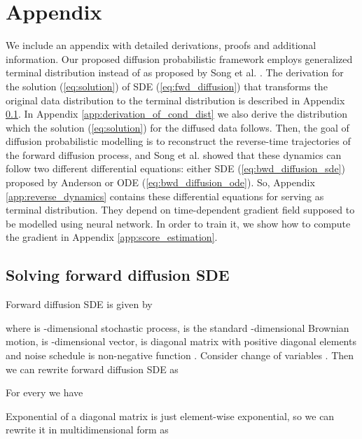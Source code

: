 \documentclass{article}
\begin{document}
\newpage
\onecolumn
\section*{Appendix}
\label{sec:appendix}
We include an appendix with detailed derivations, proofs and additional information. Our proposed diffusion probabilistic framework employs generalized terminal distribution  instead of  as proposed by Song et al. . The derivation for the solution (\ref{eq:solution}) of SDE (\ref{eq:fwd_diffusion}) that transforms the original data distribution to the terminal distribution is described in Appendix \ref{app:solving_forward_diff_sde}. In Appendix \ref{app:derivation_of_cond_dist} we also derive the distribution which the solution (\ref{eq:solution}) for the diffused data  follows. Then, the goal of diffusion probabilistic modelling is to reconstruct the reverse-time trajectories of the forward diffusion process, and Song et al.  showed that these dynamics can follow two different differential equations: either SDE (\ref{eq:bwd_diffusion_sde}) proposed by Anderson  or ODE (\ref{eq:bwd_diffusion_ode}). So, Appendix \ref{app:reverse_dynamics} contains these differential equations for  serving as terminal distribution. They depend on time-dependent gradient field  supposed to be modelled using neural network. In order to train it, we show how to compute the gradient in Appendix \ref{app:score_estimation}.

\renewcommand{\thesubsection}{\Alph{subsection}}

\subsection{Solving forward diffusion SDE}
\label{app:solving_forward_diff_sde}

Forward diffusion SDE is given by 



where  is -dimensional stochastic process,  is the standard -dimensional Brownian motion,  is -dimensional vector,  is  diagonal matrix with positive diagonal elements  and noise schedule  is non-negative function . Consider change of variables . Then we can rewrite forward diffusion SDE as



For every  we have



Exponential of a diagonal matrix is just element-wise exponential, so we can rewrite it in multidimensional form as
\end{document}
